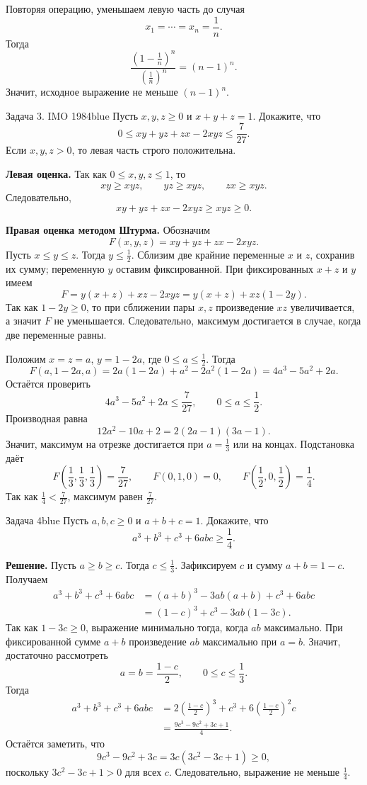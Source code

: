 Повторяя операцию, уменьшаем левую часть до случая
\[
    x_1=\cdots=x_n=\frac1n.
\]
Тогда
\[
    \frac{(1-\frac1n)^n}{(\frac1n)^n}=(n-1)^n.
\]
Значит, исходное выражение не меньше $(n-1)^n$.

{}
\begin{taskbox}{Задача 3. IMO 1984}{blue}{}
Пусть $x,y,z\ge0$ и $x+y+z=1$. Докажите, что
\[
    0\le xy+yz+zx-2xyz\le \frac7{27}.
\]
Если $x,y,z>0$, то левая часть строго положительна.
\end{taskbox}

\textbf{Левая оценка.}
Так как $0\le x,y,z\le1$, то
\[
    xy\ge xyz,
    \qquad yz\ge xyz,
    \qquad zx\ge xyz.
\]
Следовательно,
\[
    xy+yz+zx-2xyz\ge xyz\ge0.
\]

\textbf{Правая оценка методом Штурма.}
Обозначим
\[
    F(x,y,z)=xy+yz+zx-2xyz.
\]
Пусть $x\le y\le z$. Тогда $y\le\frac12$. Сблизим две крайние переменные $x$ и $z$, сохранив их сумму; переменную $y$ оставим фиксированной. При фиксированных $x+z$ и $y$ имеем
\[
    F= y(x+z)+xz-2xyz=y(x+z)+xz(1-2y).
\]
Так как $1-2y\ge0$, то при сближении пары $x,z$ произведение $xz$ увеличивается, а значит $F$ не уменьшается. Следовательно, максимум достигается в случае, когда две переменные равны.

Положим $x=z=a$, $y=1-2a$, где $0\le a\le\frac12$. Тогда
\[
    F(a,1-2a,a)=2a(1-2a)+a^2-2a^2(1-2a)
    =4a^3-5a^2+2a.
\]
Остаётся проверить
\[
    4a^3-5a^2+2a\le \frac7{27},\qquad 0\le a\le\frac12.
\]
Производная равна
\[
    12a^2-10a+2=2(2a-1)(3a-1).
\]
Значит, максимум на отрезке достигается при $a=\frac13$ или на концах. Подстановка даёт
\[
    F\left(\frac13,\frac13,\frac13\right)=\frac7{27},
    \qquad
    F(0,1,0)=0,
    \qquad
    F\left(\frac12,0,\frac12\right)=\frac14.
\]
Так как $\frac14<\frac7{27}$, максимум равен $\frac7{27}$.


{}
\begin{taskbox}{Задача 4}{blue}{}
Пусть $a,b,c\ge0$ и $a+b+c=1$. Докажите, что
\[
    a^3+b^3+c^3+6abc\ge \frac14.
\]
\end{taskbox}

\textbf{Решение.}
Пусть $a\ge b\ge c$. Тогда $c\le\frac13$. Зафиксируем $c$ и сумму $a+b=1-c$. Получаем
\[
\begin{aligned}
    a^3+b^3+c^3+6abc
    &=(a+b)^3-3ab(a+b)+c^3+6abc\\
    &=(1-c)^3+c^3-3ab(1-3c).
\end{aligned}
\]
Так как $1-3c\ge0$, выражение минимально тогда, когда $ab$ максимально. При фиксированной сумме $a+b$ произведение $ab$ максимально при $a=b$. Значит, достаточно рассмотреть
\[
    a=b=\frac{1-c}{2},\qquad 0\le c\le\frac13.
\]
Тогда
\[
\begin{aligned}
    a^3+b^3+c^3+6abc
    &=2\left(\frac{1-c}{2}\right)^3+c^3+6\left(\frac{1-c}{2}\right)^2c\\
    &=\frac{9c^3-9c^2+3c+1}{4}.
\end{aligned}
\]
Остаётся заметить, что
\[
    9c^3-9c^2+3c=3c(3c^2-3c+1)\ge0,
\]
поскольку $3c^2-3c+1>0$ для всех $c$. Следовательно, выражение не меньше $\frac14$.

